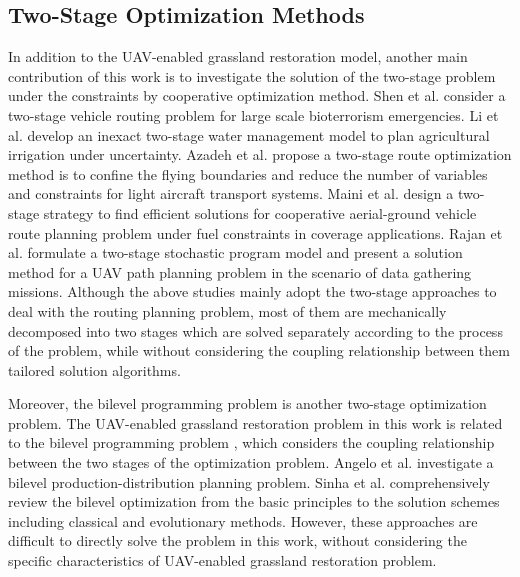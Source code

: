 \documentclass[preprint,5pt]{elsarticle}
\begin{document}
\subsection{Two-Stage Optimization Methods}
In addition to the UAV-enabled grassland restoration model, another main contribution of this work is to investigate the solution of the two-stage problem under the constraints by cooperative optimization method. Shen et al. \cite{shen2009two} consider a two-stage vehicle routing problem for large scale bioterrorism emergencies. Li et al. \cite{li2010inexact} develop an inexact two-stage water management model to plan agricultural irrigation under uncertainty. Azadeh et al. \cite{azadeh2019two} propose a two-stage route optimization method is to confine the flying boundaries and reduce the number of variables and constraints for light aircraft transport systems. Maini et al. \cite{maini2019cooperative} design a two-stage strategy to find efficient solutions for cooperative aerial-ground vehicle route planning problem under fuel constraints in coverage applications. Rajan et al. \cite{rajan2022routing} formulate a two-stage stochastic program model and present a solution method for a UAV path planning problem in the scenario of data gathering missions. Although the above studies mainly adopt the two-stage approaches to deal with the routing planning problem, most of them are mechanically decomposed into two stages which are solved separately according to the process of the problem, while without considering the coupling relationship between them tailored solution algorithms.

Moreover, the bilevel programming problem \cite{colson2007overview} is another two-stage optimization problem. The UAV-enabled grassland restoration problem in this work is related to the bilevel programming problem \cite{colson2007overview}, which considers the coupling relationship between the two stages of the optimization problem.
Angelo et al. \cite{angelo2015study} investigate a bilevel production-distribution planning problem. %
Sinha et al. \cite{sinha2017review} comprehensively review the bilevel optimization from the basic principles to the solution schemes including classical and evolutionary methods. However, these approaches are difficult to directly solve the problem in this work, without considering the specific characteristics of UAV-enabled grassland restoration problem.
\end{document}
